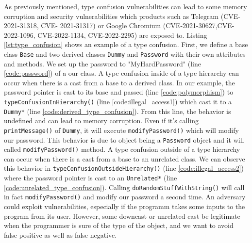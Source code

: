 \documentclass[a4paper,11pt,oneside]{report}
\begin{document}
As previously mentioned, type confusion vulnerabilities can lead to some memory
corruption and security vulnerabilities which products such as Telegram
(CVE-2021-31318, CVE- 2021-31317) or Google Chromium
(CVE-2021-30627,CVE-2022-1096, CVE-2022-1134, CVE-2022-2295) are exposed to.
Listing \autoref{lst:type_confusion} shows an example of a type confusion.
First, we define a base class \texttt{Base} and two derived classes
\texttt{Dummy} and \texttt{Password} with their own attributes and methods. We
set up the password to "MyHardPassword" (line \ref{code:password}) of a our
class.  A type confusion inside of a type hierarchy can occur when there is a
cast from a base to a derived class.  In our example, the password pointer is
cast to its base and passed (line \ref{code:polymorphism}) to
\texttt{typeConfusionInHierarchy()} (line \ref{code:illegal_access1}) which cast
it to a \texttt{Dummy*} (line \ref{code:derived_type_confusion}).  From this
line, the behavior is undefined and can lead to memory corruption. Even if it's
calling \texttt{printMessage()} of \texttt{Dummy}, it will execute
\texttt{modifyPassword()} which will modify our password.  This behavior is due
to object being a \texttt{Password} object and it will called
\texttt{modifyPassword()} method.  A type confusion outside of a type hierarchy
can occur when there is a cast from a base to an unrelated class.  We can
observe this behavior in \texttt{typeConfusionOutsideHierarchy()} (line
\ref{code:illegal_access2})  where the password pointer is cast to an
\texttt{Unrelated*} (line \ref{code:unrelated_type_confusion}).  Calling
\texttt{doRandomStuffWithString()} will call in fact \texttt{modifyPassword()}
and modify our password a second time.  An adversary could exploit
vulnerabilities, especially if the programm takes some inputs to the program
from its user.  However, some downcast or unrelated cast be legitimate when the
programmer is sure of the type of the object, and we want to avoid false
positive as well as false negative.
\end{document}
